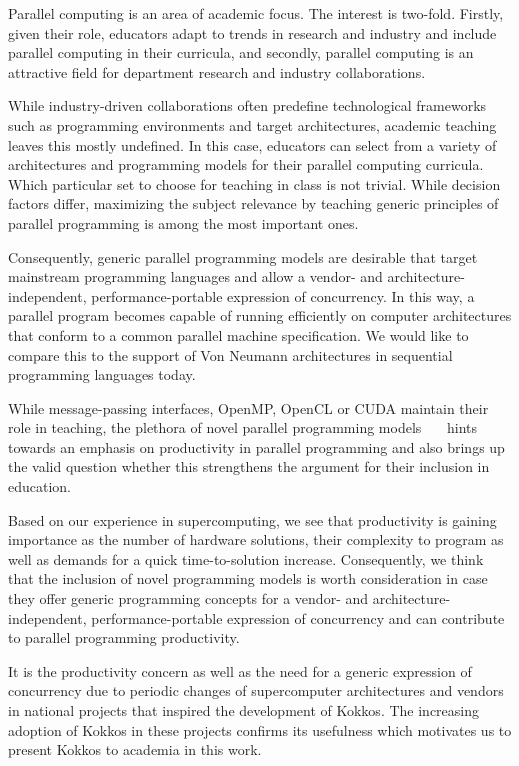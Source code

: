 
Parallel computing is an area of academic focus. The interest is two-fold. Firstly, given their role, educators adapt to trends in research and industry and include parallel computing in their curricula, and secondly, parallel computing is an attractive field for department research and industry collaborations. 

While industry-driven collaborations often predefine technological frameworks such as programming environments and target architectures, academic teaching leaves this mostly undefined. In this case, educators can select from a variety of architectures and programming models for their parallel computing curricula. Which particular set to choose for teaching in class is not trivial. While decision factors differ, maximizing the subject relevance by teaching generic principles of parallel programming is among the most important ones. 

Consequently, generic parallel programming models are desirable that target mainstream programming languages and allow a vendor- and architecture-independent, performance-portable expression of concurrency. In this way, a parallel program becomes capable of running efficiently on computer architectures that conform to a common parallel machine specification. We would like to compare this to the support of Von Neumann architectures in sequential programming languages today. 

While message-passing interfaces, OpenMP, OpenCL or CUDA maintain their role in teaching, the plethora of novel parallel programming models~\cite{Chapel}~\cite{UPC++}~\cite{Raja} hints towards an emphasis on productivity in parallel programming and also brings up the valid question whether this strengthens the argument for their inclusion in education. 

Based on our experience in supercomputing, we see that productivity is gaining importance as the number of hardware solutions, their complexity to program as well as demands for a quick time-to-solution increase. Consequently, we think that the inclusion of novel programming models is worth consideration in case they offer generic programming concepts for a vendor- and architecture-independent, performance-portable expression of concurrency and can contribute to parallel programming productivity. 

It is the productivity concern as well as the need for a generic expression of concurrency due to periodic changes of supercomputer architectures and vendors in national projects that inspired the development of Kokkos. The increasing adoption of Kokkos in these projects confirms its usefulness which motivates us to present Kokkos to academia in this work.

